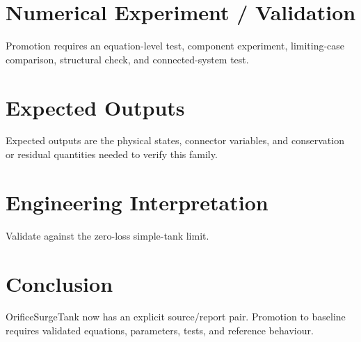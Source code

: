 \documentclass[10pt,a4paper]{article}
\begin{document}
\section{Numerical Experiment / Validation}Promotion requires an equation-level test, component experiment, limiting-case comparison, structural check, and connected-system test.
\section{Expected Outputs}Expected outputs are the physical states, connector variables, and conservation or residual quantities needed to verify this family.
\section{Engineering Interpretation}Validate against the zero-loss simple-tank limit.
\section*{Conclusion}OrificeSurgeTank now has an explicit source/report pair. Promotion to baseline requires validated equations, parameters, tests, and reference behaviour.
\end{document}
